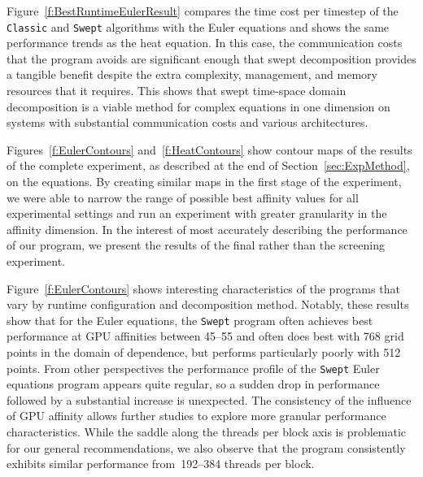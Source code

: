 Figure~\ref{f:BestRuntimeEulerResult} compares the time cost per timestep of the \texttt{Classic} and \texttt{Swept} algorithms with the Euler equations and shows the same performance trends as the heat equation.
In this case, the communication costs that the program avoids are significant enough that swept decomposition provides a tangible benefit despite the extra complexity, management, and memory resources that it requires.
This shows that swept time-space domain decomposition is a viable method for complex equations in one dimension on systems with substantial communication costs and various architectures.

Figures~\ref{f:EulerContours} and~\ref{f:HeatContours} show contour maps of the results
of the complete experiment, as described at the end of Section~\ref{sec:ExpMethod}, on the equations.
By creating similar maps in the first stage of the experiment, we were able to narrow the range of possible best affinity values for all experimental settings and run an experiment with greater granularity in the affinity dimension.
In the interest of most accurately describing the performance of our program, we present the results of the final rather than the screening experiment.

Figure~\ref{f:EulerContours} shows interesting characteristics of the programs that vary by runtime configuration and decomposition method.
Notably, these results show that for the Euler equations, the \texttt{Swept} program often achieves best performance at GPU affinities between \numrange{45}{55} and often does best with \num{768} grid points in the domain of dependence, but performs particularly poorly with \num{512} points.
From other perspectives the performance profile of the \texttt{Swept} Euler equations program appears quite regular, so a sudden drop in performance followed by a substantial increase is unexpected.
The consistency of the influence of GPU affinity allows further studies to explore more granular performance characteristics.
While the saddle along the threads per block axis is problematic for our
general recommendations, we also observe that the program consistently exhibits similar performance from~\numrange{192}{384} threads per block.

